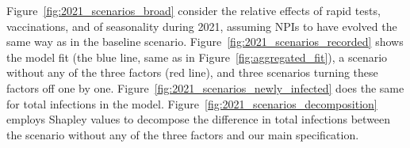 Figure~\ref{fig:2021_scenarios_broad} consider the relative effects of rapid
tests, vaccinations, and of seasonality during 2021, assuming NPIs to have
evolved the same way as in the baseline scenario.
Figure~\ref{fig:2021_scenarios_recorded} shows the model fit (the blue line,
same as in Figure~\ref{fig:aggregated_fit}), a scenario without any of the three
factors (red line), and three scenarios turning these factors off one by one.
Figure~\ref{fig:2021_scenarios_newly_infected} does the same for total
infections in the model. Figure~\ref{fig:2021_scenarios_decomposition} employs
Shapley values to decompose the difference in total infections between the
scenario without any of the three factors and our main specification.

\begin{figure}[!tp]
    \centering


\end{figure}
